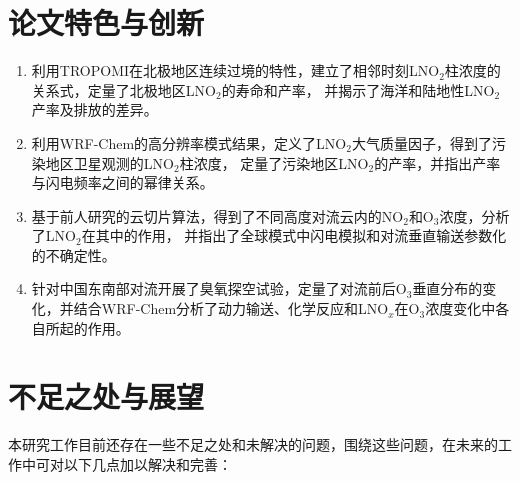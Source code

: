 \section{论文特色与创新}

\begin{enumerate}[label=（\arabic*）, labelindent=\parindent, leftmargin=0pt, widest=0, itemindent=*, topsep=0pt, partopsep=0pt, parsep=0pt]

\item 利用TROPOMI在北极地区连续过境的特性，建立了相邻时刻LNO$_2$柱浓度的关系式，定量了北极地区LNO$_2$的寿命和产率，
并揭示了海洋和陆地性LNO$_2$产率及排放的差异。

\item 利用WRF-Chem的高分辨率模式结果，定义了LNO$_2$大气质量因子，得到了污染地区卫星观测的LNO$_2$柱浓度，
定量了污染地区LNO$_2$的产率，并指出产率与闪电频率之间的幂律关系。

\item 基于前人研究的云切片算法，得到了不同高度对流云内的NO$_2$和O$_3$浓度，分析了LNO$_2$在其中的作用，
并指出了全球模式中闪电模拟和对流垂直输送参数化的不确定性。

\item 针对中国东南部对流开展了臭氧探空试验，定量了对流前后O$_3$垂直分布的变化，并结合WRF-Chem分析了动力输送、化学反应和LNO$_x$在O$_3$浓度变化中各自所起的作用。

\end{enumerate}



\section{不足之处与展望}

本研究工作目前还存在一些不足之处和未解决的问题，围绕这些问题，在未来的工作中可对以下几点加以解决和完善：

